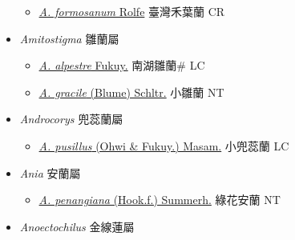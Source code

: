 \begin{itemize}
  \begin{itemize}
        \item[] \href{http://www.theplantlist.org/tpl1.1/search?q=Agrostophyllum+formosanum}{\textit{A. formosanum} Rolfe}     臺灣禾葉蘭 CR
  \end{itemize}
 \item[] \textit{Amitostigma} 雛蘭屬
                    
  \begin{itemize}
        \item[] \href{http://www.theplantlist.org/tpl1.1/search?q=Amitostigma+alpestre}{\textit{A. alpestre} Fukuy.}   南湖雛蘭\# LC
        \item[] \href{http://www.theplantlist.org/tpl1.1/search?q=Amitostigma+gracile}{\textit{A. gracile} (Blume) Schltr.}   小雛蘭 NT
  \end{itemize}
 \item[] \textit{Androcorys} 兜蕊蘭屬
                    
  \begin{itemize}
        \item[] \href{http://www.theplantlist.org/tpl1.1/search?q=Androcorys+pusillus}{\textit{A. pusillus} (Ohwi \& Fukuy.) Masam.}   小兜蕊蘭 LC
  \end{itemize}
 \item[] \textit{Ania} 安蘭屬
                    
  \begin{itemize}
        \item[] \href{http://www.theplantlist.org/tpl1.1/search?q=Ania+penangiana}{\textit{A. penangiana} (Hook.f.) Summerh.}   綠花安蘭 NT
  \end{itemize}
 \item[] \textit{Anoectochilus} 金線蓮屬
                    

\end{itemize}
